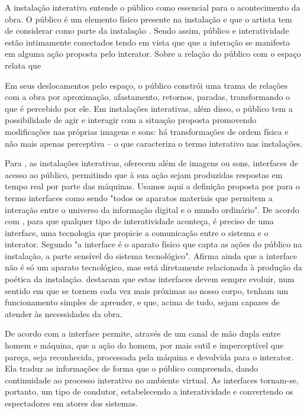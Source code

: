 A instalação interativa entende o público como essencial para o acontecimento da obra. O público é um elemento físico presente na instalação e que o artista tem de considerar como parte da instalação \cite[p. 64]{sogabe2011}. Sendo assim, público e interatividade estão intimamente conectados tendo em vista que que a interação se manifesta em alguma ação proposta pelo interator. Sobre a relação do público com o espaço  relata que

\begin{citacao}
Em seus deslocamentos pelo espaço, o público constrói uma trama de relações com a obra por aproximação, afastamento, retornos, paradas, transformando o que é percebido por ele. Em instalações interativas, além disso, o público tem a possibilidade de agir e interagir com a situação proposta promovendo modificações nas próprias imagens e sons:  há transformações de ordem física e não mais apenas perceptiva – o que caracteriza o termo interativo nas instalações.  \cite[p. 6]{bochio}  
\end{citacao}

Para , as instalações interativas, oferecem além de imagens ou sons, interfaces de acesso ao público, permitindo que à sua ação sejam produzidas respostas em tempo real por parte das máquinas. Usamos aqui a definição proposta por  para o termo interfaces como sendo "todos os aparatos materiais que permitem a interação entre o universo da informação digital e o mundo ordinário". De acordo com , para que qualquer tipo de interatividade aconteça, é preciso de uma interface, uma tecnologia que propicie a comunicação entre o sistema e o interator. Segundo  "a interface é o aparato físico que capta as ações do público na instalação, a parte sensível do sistema tecnológico". Afirma ainda que a interface não é só um aparato tecnológico, mas está diretamente relacionada à produção da poética da instalação.  destacam que estas interfaces devem sempre evoluir, num sentido em que se tornem cada vez mais próximas ao nosso corpo, tenham um funcionamento simples de aprender, e que, acima de tudo, sejam capazes de atender às necessidades da obra.


De acordo com  a interface permite, através de um canal de mão dupla entre homem e máquina, que a ação do homem, por mais sutil e imperceptível que pareça, seja reconhecida, processada pela máquina e devolvida para o interator. Ela traduz as informações de forma que o público compreenda, dando continuidade ao processo interativo no ambiente virtual. As interfaces tornam-se, portanto, um tipo de condutor, estabelecendo a interatividade e convertendo os espectadores em atores dos sistemas. 

